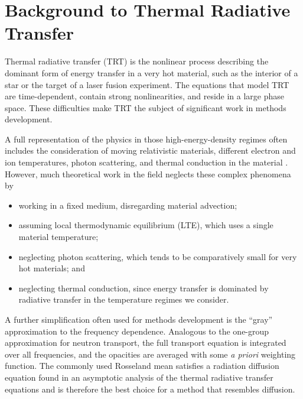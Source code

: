 
\chapter{Background to Thermal Radiative Transfer}\label{chap:trtBackground}

Thermal radiative transfer (TRT) is the nonlinear process describing the
dominant form of energy transfer in a very hot material, such as the interior
of a star or the
target of a laser fusion experiment. The equations that model TRT are
time-dependent, contain strong nonlinearities, and reside in a large phase
space. These difficulties make TRT the subject of significant work in methods
development.

A full representation of the physics in
those high-energy-density regimes often includes the consideration of moving
relativistic materials, different electron and ion temperatures, photon
scattering, and thermal conduction in the material \cite{Mih1984}. However,
much theoretical work in the field neglects these complex phenomena by
\begin{itemize}
  \item working in a fixed medium, disregarding material advection;
  \item assuming local thermodynamic equilibrium (LTE), which uses a single
    material temperature;
  \item neglecting photon scattering, which tends to be comparatively small for
    very hot materials; and
  \item neglecting thermal conduction, since energy transfer is dominated by
    radiative transfer in the temperature regimes we consider.
\end{itemize}

A further simplification often used for methods development is the ``gray''
approximation to the frequency dependence. Analogous to the one-group
approximation for neutron transport, the full transport equation is integrated
over all frequencies, and the opacities are averaged with some \emph{a priori}
weighting function. The commonly used Rosseland mean satisfies a radiation
diffusion equation found in an asymptotic analysis of the thermal radiative
transfer equations \cite{Lar1983a} and is therefore the best choice for a
method that resembles diffusion.


